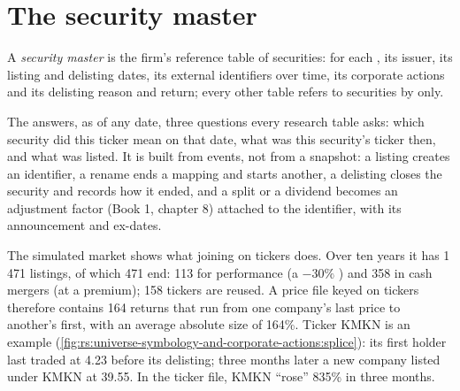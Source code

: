 \section{The security master}

\begin{definition}\label{def:rs:universe-symbology-and-corporate-actions:master}
A \emph{security master} is the firm's reference table of securities: for each , its
issuer, its listing and delisting dates, its external identifiers over time, its corporate actions and its delisting reason and
return; every other table refers to securities by  only.
\end{definition}

The  answers, as of any date, three questions every research table asks: which security did this ticker mean
on that date, what was this security's ticker then, and what was listed. It is built from events, not from a snapshot: a listing
creates an identifier, a rename ends a mapping and starts another, a delisting closes the security and records how it ended,
and a split or a dividend becomes an adjustment factor (Book 1, chapter 8) attached to the identifier, with its announcement and
ex-dates.

The simulated market shows what joining on tickers does. Over ten years it has 1\,471 listings, of which 471 end: 113 for
performance (a $-30\%$ ) and 358 in cash mergers (at a premium); 158 tickers are reused. A price file keyed on
tickers therefore contains 164 returns that run from one company's last price to another's first, with an average absolute
size of 164\%. Ticker KMKN is an example (\cref{fig:rs:universe-symbology-and-corporate-actions:splice}): its first holder last
traded at 4.23 before its delisting; three months later a new company listed under KMKN at 39.55. In the ticker file, KMKN
``rose'' 835\% in three months.

